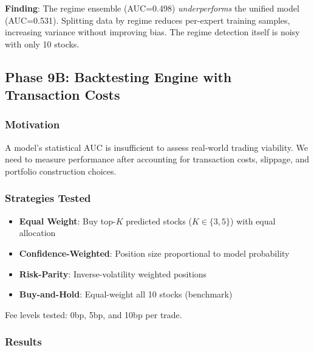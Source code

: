 \documentclass[12pt,a4paper]{article}
\begin{document}
\noindent\textbf{Finding}: The regime ensemble (AUC=0.498) \textit{underperforms} the unified
model (AUC=0.531). Splitting data by regime reduces per-expert training samples, increasing
variance without improving bias. The regime detection itself is noisy with only 10 stocks.

\subsection{Phase 9B: Backtesting Engine with Transaction Costs}

\subsubsection{Motivation}
A model's statistical AUC is insufficient to assess real-world trading viability. We need
to measure performance after accounting for transaction costs, slippage, and portfolio
construction choices.

\subsubsection{Strategies Tested}
\begin{itemize}
    \item \textbf{Equal Weight}: Buy top-$K$ predicted stocks ($K \in \{3, 5\}$) with equal allocation
    \item \textbf{Confidence-Weighted}: Position size proportional to model probability
    \item \textbf{Risk-Parity}: Inverse-volatility weighted positions
    \item \textbf{Buy-and-Hold}: Equal-weight all 10 stocks (benchmark)
\end{itemize}

Fee levels tested: 0bp, 5bp, and 10bp per trade.

\subsubsection{Results}
\end{document}
